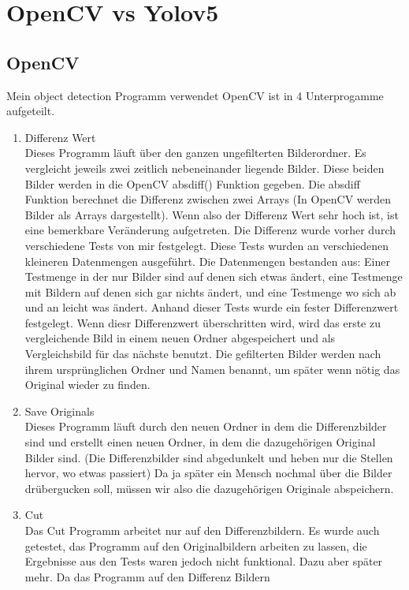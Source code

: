 \documentclass[11pt]{scrartcl}
\begin{document}
\section{OpenCV vs Yolov5}

\subsection{OpenCV}
Mein object detection Programm verwendet OpenCV ist in 4 Unterprogamme aufgeteilt.
\begin{enumerate}
    \item Differenz Wert \\
    Dieses Programm läuft über den ganzen ungefilterten Bilderordner. Es vergleicht jeweils zwei zeitlich nebeneinander liegende Bilder.
    Diese beiden Bilder werden in die OpenCV absdiff() Funktion gegeben. Die absdiff Funktion berechnet die Differenz zwischen zwei Arrays
    (In OpenCV werden Bilder als Arrays dargestellt). Wenn also der Differenz Wert sehr hoch ist, ist eine bemerkbare Veränderung aufgetreten.
    Die Differenz wurde vorher durch verschiedene Tests von mir festgelegt. Diese Tests wurden an verschiedenen kleineren Datenmengen ausgeführt.
    Die Datenmengen bestanden aus: Einer Testmenge in der nur Bilder sind auf denen sich etwas ändert, eine Testmenge mit Bildern auf denen sich gar nichts ändert,
    und eine Testmenge wo sich ab und an leicht was ändert. Anhand dieser Tests wurde ein fester Differenzwert festgelegt.
    Wenn diesr Differenzwert überschritten wird, wird das erste zu vergleichende Bild in einem neuen Ordner abgespeichert 
    und als Vergleichsbild für das nächste benutzt. Die gefilterten Bilder werden nach ihrem ursprünglichen Ordner und Namen benannt,
    um später wenn nötig das Original wieder zu finden.
    \item Save Originals \\
    Dieses Programm läuft durch den neuen Ordner in dem die Differenzbilder sind und erstellt einen neuen Ordner,
    in dem die dazugehörigen Original Bilder sind. (Die Differenzbilder sind abgedunkelt und heben nur die Stellen hervor, wo etwas passiert)
    Da ja später ein Mensch nochmal über die Bilder drübergucken soll, müssen wir also die dazugehörigen Originale abspeichern.
    \item Cut \\
    Das Cut Programm arbeitet nur auf den Differenzbildern. Es wurde auch getestet, das Programm auf den Originalbildern arbeiten zu
    lassen, die Ergebnisse aus den Tests waren jedoch nicht funktional. Dazu aber später mehr. Da das Programm auf den Differenz Bildern

\end{enumerate}
\end{document}
